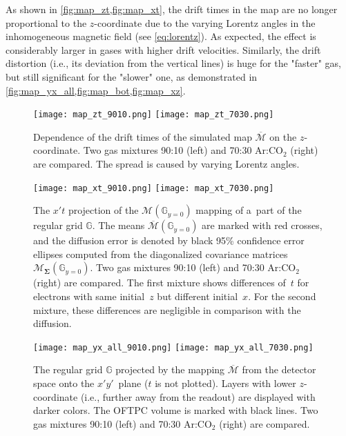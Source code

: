 		As shown in \cref{fig:map_zt,fig:map_xt}, the drift times in the map are no longer proportional to the $z$\nobreakdash-coordinate due to the varying Lorentz angles in the inhomogeneous magnetic field (see \cref{eq:lorentz}). As expected, the effect is considerably larger in gases with higher drift velocities. Similarly, the drift distortion (i.e., its deviation from the vertical lines) is huge for the "faster" gas, but still significant for the "slower" one, as demonstrated in \cref{fig:map_yx_all,fig:map_bot,fig:map_xz}.
		
		\begin{figure}
			\centering
			\texttt{[image: map\_zt\_9010.png]}
			\hfill
			\texttt{[image: map\_zt\_7030.png]}
			\caption{Dependence of the drift times of the simulated map $\overline{\mathcal{M}}$ on the $z$\protect\nobreakdash-coordinate. Two gas mixtures 90:10 (left) and 70:30 Ar:CO$_2$ (right) are compared. The spread is caused by varying Lorentz angles.}
			\label{fig:map_zt}
		\end{figure}
		
		\begin{figure}
			\centering
			\texttt{[image: map\_xt\_9010.png]}
			\hfill
			\texttt{[image: map\_xt\_7030.png]}
			\caption{The $x't$ projection of the $\mathcal{M}(\mathbb{G}_{y=0})$ mapping of a~part of the regular grid $\mathbb{G}$. The means $\overline{\mathcal{M}}(\mathbb{G}_{y=0})$ are marked with red crosses, and the diffusion error is denoted by black 95\% confidence error ellipses computed from the diagonalized covariance matrices $\mathcal{M}_{\mathbf{\Sigma}}(\mathbb{G}_{y=0})$. Two gas mixtures 90:10 (left) and 70:30 Ar:CO$_2$ (right) are compared. The first mixture shows differences of~$t$ for electrons with same initial~$z$ but different initial~$x$. For the second mixture, these differences are negligible in comparison with the diffusion.}
			\label{fig:map_xt}
		\end{figure}
		
		\begin{figure}
			\centering
			\texttt{[image: map\_yx\_all\_9010.png]}
			\hfill
			\texttt{[image: map\_yx\_all\_7030.png]}
			\caption{The regular grid $\mathbb{G}$ projected by the mapping $\overline{\mathcal{M}}$ from the detector space onto the $x'y'$~plane ($t$ is not plotted). Layers with lower $z$\protect\nobreakdash-coordinate (i.e., further away from the readout) are displayed with darker colors. The \ac{OFTPC} volume is marked with black lines. Two gas mixtures 90:10 (left) and 70:30 Ar:CO$_2$ (right) are compared.}
			\label{fig:map_yx_all}
		\end{figure}
		
